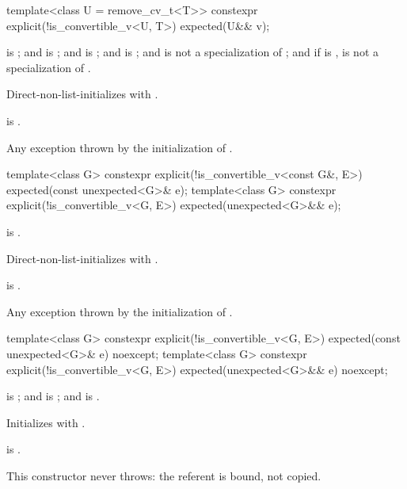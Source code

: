 %
\begin{itemdecl}
template<class U = remove_cv_t<T>>
constexpr explicit(!is_convertible_v<U, T>) expected(U&& v);
\end{itemdecl}

\begin{itemdescr}
\pnum
\constraints
{} is ; and  is ; and  is ; and  is ; and  is not a specialization of ; and if  is ,  is not a specialization of .

\pnum
\effects
Direct-non-list-initializes  with .

\pnum
\ensures
{} is .

\pnum
\throws
Any exception thrown by the initialization of .
\end{itemdescr}

%
\begin{itemdecl}
template<class G>
constexpr explicit(!is_convertible_v<const G&, E>) expected(const unexpected<G>& e);
template<class G>
constexpr explicit(!is_convertible_v<G, E>) expected(unexpected<G>&& e);
\end{itemdecl}

\begin{itemdescr}
\pnum
\constraints
{} is .

\pnum
\effects
Direct-non-list-initializes  with .

\pnum
\ensures
{} is .

\pnum
\throws
Any exception thrown by the initialization of .
\end{itemdescr}

%
\begin{itemdecl}
template<class G>
constexpr explicit(!is_convertible_v<G, E>) expected(const unexpected<G>& e) noexcept;
template<class G>
constexpr explicit(!is_convertible_v<G, E>) expected(unexpected<G>&& e) noexcept;
\end{itemdecl}

\begin{itemdescr}
\pnum
\constraints
{} is ; and  is ; and  is .

\pnum
\effects
Initializes  with .

\pnum
\ensures
{} is .

\pnum
\remarks
This constructor never throws: the referent is bound, not copied.
\end{itemdescr}

